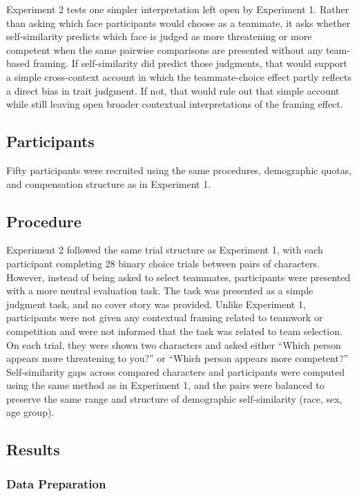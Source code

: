 \documentclass[
  man,
  floatsintext,
  longtable,
  nolmodern,
  notxfonts,
  notimes,
  draftfirst,
  colorlinks=true,linkcolor=blue,citecolor=blue,urlcolor=blue]{apa7}
\begin{document}
Experiment 2 tests one simpler interpretation left open by Experiment 1.
Rather than asking which face participants would choose as a teammate,
it asks whether self-similarity predicts which face is judged as more
threatening or more competent when the same pairwise comparisons are
presented without any team-based framing. If self-similarity did predict
those judgments, that would support a simple cross-context account in
which the teammate-choice effect partly reflects a direct bias in trait
judgment. If not, that would rule out that simple account while still
leaving open broader contextual interpretations of the framing effect.

\subsection{Participants}\label{participants-1}

Fifty participants were recruited using the same procedures, demographic
quotas, and compensation structure as in Experiment 1.

\subsection{Procedure}\label{procedure-1}

Experiment 2 followed the same trial structure as Experiment 1, with
each participant completing 28 binary choice trials between pairs of
characters. However, instead of being asked to select teammates,
participants were presented with a more neutral evaluation task. The
task was presented as a simple judgment task, and no cover story was
provided. Unlike Experiment 1, participants were not given any
contextual framing related to teamwork or competition and were not
informed that the task was related to team selection. On each trial,
they were shown two characters and asked either ``Which person appears
more threatening to you?'' or ``Which person appears more competent?''
Self-similarity gaps across compared characters and participants were
computed using the same method as in Experiment 1, and the pairs were
balanced to preserve the same range and structure of demographic
self-similarity (race, sex, age group).

\subsection{Results}\label{results-1}

\subsubsection{Data Preparation}\label{data-preparation-1}
\end{document}
